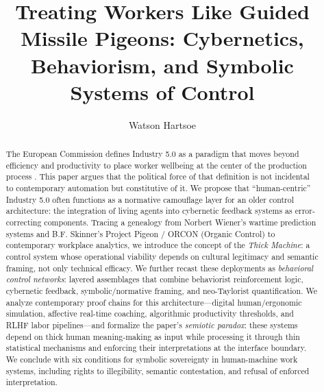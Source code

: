 \documentclass[runningheads]{llncs}
\begin{document}
\title{Treating Workers Like Guided Missile Pigeons: Cybernetics, Behaviorism, and Symbolic Systems of Control}

\author{Watson Hartsoe}

\maketitle

\begin{abstract}
The European Commission defines Industry 5.0 as a paradigm that moves beyond efficiency and productivity to place worker wellbeing at the center of the production process \cite{breque2021industry}. This paper argues that the political force of that definition is not incidental to contemporary automation but constitutive of it. We propose that ``human-centric'' Industry 5.0 often functions as a normative camouflage layer for an older control architecture: the integration of living agents into cybernetic feedback systems as error-correcting components. Tracing a genealogy from Norbert Wiener's wartime prediction systems and B.F. Skinner's Project Pigeon / ORCON (Organic Control) to contemporary workplace analytics, we introduce the concept of the \emph{Thick Machine}: a control system whose operational viability depends on cultural legitimacy and semantic framing, not only technical efficacy. We further recast these deployments as \emph{behavioral control networks}: layered assemblages that combine behaviorist reinforcement logic, cybernetic feedback, symbolic/normative framing, and neo-Taylorist quantification. We analyze contemporary proof chains for this architecture---digital human/ergonomic simulation, affective real-time coaching, algorithmic productivity thresholds, and RLHF labor pipelines---and formalize the paper's \emph{semiotic paradox}: these systems depend on thick human meaning-making as input while processing it through thin statistical mechanisms and enforcing their interpretations at the interface boundary. We conclude with six conditions for symbolic sovereignty in human-machine work systems, including rights to illegibility, semantic contestation, and refusal of enforced interpretation.

\end{abstract}
\end{document}
